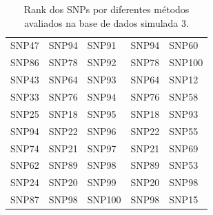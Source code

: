 \begin{table}[ht]
\begin{tabular}{lllll}
  SNP47 & SNP94 & SNP91 & SNP94 & SNP60 \\ 
  SNP86 & SNP78 & SNP92 & SNP78 & SNP100 \\ 
  SNP43 & SNP64 & SNP93 & SNP64 & SNP12 \\ 
  SNP33 & SNP76 & SNP94 & SNP76 & SNP58 \\ 
  SNP25 & SNP18 & SNP95 & SNP18 & SNP93 \\ 
  SNP94 & SNP22 & SNP96 & SNP22 & SNP55 \\ 
  SNP74 & SNP21 & SNP97 & SNP21 & SNP69 \\ 
  SNP62 & SNP89 & SNP98 & SNP89 & SNP53 \\ 
  SNP24 & SNP20 & SNP99 & SNP20 & SNP98 \\ 
  SNP87 & SNP98 & SNP100 & SNP98 & SNP15 \\ 
   \hline
\end{tabular}
\caption{Rank dos SNPs por diferentes métodos avaliados na base de dados simulada 3.} 
\label{tab:ranks}
\end{table}
